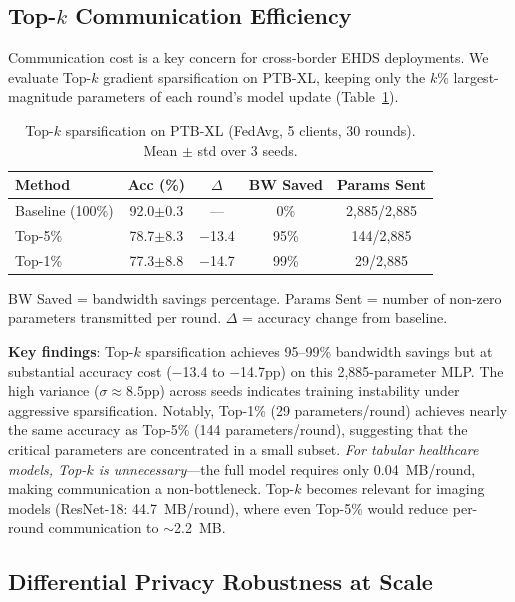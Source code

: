 \documentclass[conference,a4paper]{IEEEtran}
\begin{document}
\subsection{Top-$k$ Communication Efficiency}
\label{sec:topk_results}

Communication cost is a key concern for cross-border EHDS deployments. We evaluate Top-$k$ gradient sparsification on PTB-XL, keeping only the $k$\% largest-magnitude parameters of each round's model update (Table~\ref{tab:topk_ptbxl}).

\begin{table}[htbp]
\centering
\caption{Top-$k$ sparsification on PTB-XL (FedAvg, 5 clients, 30 rounds). Mean $\pm$ std over 3 seeds.}
\label{tab:topk_ptbxl}
\small
\begin{tabular}{lcccc}
\toprule
\textbf{Method} & \textbf{Acc (\%)} & \textbf{$\Delta$} & \textbf{BW Saved} & \textbf{Params Sent} \\
\midrule
Baseline (100\%) & 92.0{\tiny$\pm$0.3} & --- & 0\% & 2,885/2,885 \\
Top-5\% & 78.7{\tiny$\pm$8.3} & $-$13.4 & 95\% & 144/2,885 \\
Top-1\% & 77.3{\tiny$\pm$8.8} & $-$14.7 & 99\% & 29/2,885 \\
\bottomrule
\end{tabular}

\vspace{1mm}
\footnotesize{BW Saved = bandwidth savings percentage. Params Sent = number of non-zero parameters transmitted per round. $\Delta$ = accuracy change from baseline.}
\end{table}

\textbf{Key findings}: Top-$k$ sparsification achieves 95--99\% bandwidth savings but at substantial accuracy cost ($-$13.4 to $-$14.7pp) on this 2,885-parameter MLP. The high variance ($\sigma \approx 8.5$pp) across seeds indicates training instability under aggressive sparsification. Notably, Top-1\% (29 parameters/round) achieves nearly the same accuracy as Top-5\% (144 parameters/round), suggesting that the critical parameters are concentrated in a small subset. \textit{For tabular healthcare models, Top-$k$ is unnecessary}---the full model requires only 0.04~MB/round, making communication a non-bottleneck. Top-$k$ becomes relevant for imaging models (ResNet-18: 44.7~MB/round), where even Top-5\% would reduce per-round communication to $\sim$2.2~MB.

\subsection{Differential Privacy Robustness at Scale}
\label{sec:dp_at_scale}
\end{document}
